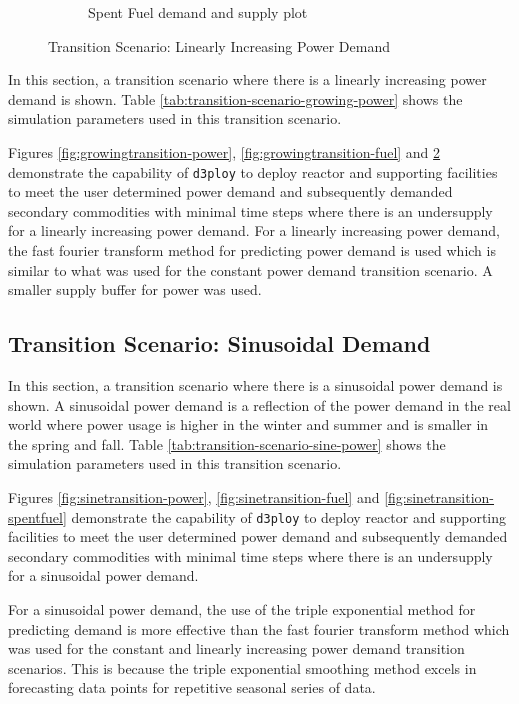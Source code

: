 \documentclass{anstrans}
\newcommand{\deploy}{\texttt{d3ploy}\xspace}%
\begin{document}
\begin{figure}[!htbp]
\begin{subfigure}[t]{0.45\textwidth}
        \caption{Spent Fuel demand and supply plot}
        \label{fig:growingtransition-spentfuel}
    \end{subfigure}
    \caption{Transition Scenario: Linearly Increasing Power Demand}
\end{figure}

In this section, a transition scenario where there is a linearly 
increasing power demand is shown. 
Table \ref{tab:transition-scenario-growing-power} shows the 
simulation parameters used in this transition scenario. 

Figures \ref{fig:growingtransition-power}, \ref{fig:growingtransition-fuel}
and \ref{fig:growingtransition-spentfuel} demonstrate the capability 
of \deploy to deploy reactor and supporting facilities to meet the user 
determined power demand and subsequently demanded secondary commodities 
with minimal time steps where there is an undersupply for a linearly 
increasing power demand. 
For a linearly increasing power demand, the fast fourier 
transform method for predicting power demand is used 
which is similar to what was used for the constant power demand 
transition scenario. 
A smaller supply buffer for power was used. 

\subsection{\textbf{Transition Scenario: Sinusoidal Demand}}
In this section, a transition scenario where there is a sinusoidal
power demand is shown. 
A sinusoidal power demand is a reflection of the power demand in 
the real world where power usage is higher in the winter and summer
and is smaller in the spring and fall. 
Table \ref{tab:transition-scenario-sine-power} shows the 
simulation parameters used in this transition scenario. 

Figures \ref{fig:sinetransition-power}, \ref{fig:sinetransition-fuel}
and \ref{fig:sinetransition-spentfuel} demonstrate the capability 
of \deploy to deploy reactor and supporting facilities to meet the user 
determined power demand and subsequently demanded secondary commodities 
with minimal time steps where there is an undersupply for a sinusoidal 
power demand. 

For a sinusoidal power demand, the use of the triple exponential method
for predicting demand is more effective than the 
fast fourier transform method which was used for the constant 
and linearly increasing power demand transition scenarios. 
This is because the triple exponential smoothing method excels in
forecasting data points for repetitive seasonal series of data.  
\end{document}
